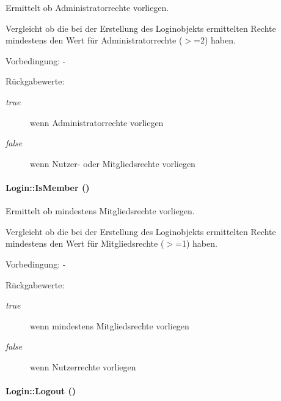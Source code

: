 Ermittelt ob Administratorrechte vorliegen. 

Vergleicht ob die bei der Erstellung des Loginobjekts ermittelten Rechte mindestens den Wert für Administratorrechte ($>$=2) haben. \begin{Desc}
\item[Vorbedingung:]- \end{Desc}
\begin{Desc}
\item[R\"{u}ckgabewerte:]
\begin{description}
\item[{\em true}]wenn Administratorrechte vorliegen \item[{\em false}]wenn Nutzer- oder Mitgliedsrechte vorliegen \end{description}
\end{Desc}
\hypertarget{classLogin_70d2747b0aa454f4203a789afea25318}{
\paragraph[IsMember]{\setlength{\rightskip}{0pt plus 5cm}Login::Is\-Member ()}\hfill}
\label{classLogin_70d2747b0aa454f4203a789afea25318}


Ermittelt ob mindestens Mitgliedsrechte vorliegen. 

Vergleicht ob die bei der Erstellung des Loginobjekts ermittelten Rechte mindestens den Wert für Mitgliedsrechte ($>$=1) haben. \begin{Desc}
\item[Vorbedingung:]- \end{Desc}
\begin{Desc}
\item[R\"{u}ckgabewerte:]
\begin{description}
\item[{\em true}]wenn mindestens Mitgliedsrechte vorliegen \item[{\em false}]wenn Nutzerrechte vorliegen \end{description}
\end{Desc}
\hypertarget{classLogin_4cbf74bd382f34e863aec07c3eda0400}{
\paragraph[Logout]{\setlength{\rightskip}{0pt plus 5cm}Login::Logout ()}\hfill}
\label{classLogin_4cbf74bd382f34e863aec07c3eda0400}


